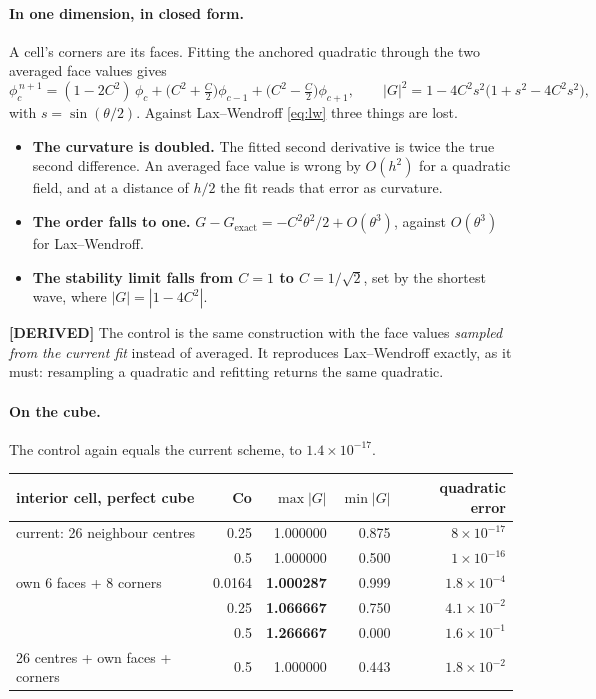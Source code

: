 \documentclass[11pt,a4paper]{article}
\newcommand{\derived}{\textcolor{blue!50!black}{\textbf{[DERIVED]}}}
\begin{document}
\paragraph{In one dimension, in closed form.} A cell's corners are its faces. Fitting the anchored
quadratic through the two averaged face values gives
\begin{equation}
  \phi_c^{\,n+1} = (1 - 2C^{2})\,\phi_c + \bigl(C^{2} + \tfrac{C}{2}\bigr)\phi_{c-1}
                 + \bigl(C^{2} - \tfrac{C}{2}\bigr)\phi_{c+1},
  \qquad
  |G|^{2} = 1 - 4C^{2}s^{2}\bigl(1 + s^{2} - 4C^{2}s^{2}\bigr),
\end{equation}
with \(s = \sin(\theta/2)\). Against Lax--Wendroff \eqref{eq:lw} three things are lost.
\begin{itemize}
\item \textbf{The curvature is doubled.} The fitted second derivative is twice the true second
      difference. An averaged face value is wrong by \(O(h^2)\) for a quadratic field, and at a
      distance of \(h/2\) the fit reads that error as curvature.
\item \textbf{The order falls to one.} \(G - G_{\text{exact}} = -C^2\theta^2/2 + O(\theta^3)\),
      against \(O(\theta^3)\) for Lax--Wendroff.
\item \textbf{The stability limit falls from \(C = 1\) to \(C = 1/\sqrt2\)}, set by the shortest
      wave, where \(|G| = |1 - 4C^2|\).
\end{itemize}

\derived{} The control is the same construction with the face values \emph{sampled from the
current fit} instead of averaged. It reproduces Lax--Wendroff exactly, as it must: resampling a
quadratic and refitting returns the same quadratic.

\paragraph{On the cube.} The control again equals the current scheme, to \(1.4\times10^{-17}\).

\begin{center}
\begin{tabular}{lrrrr}
\toprule
interior cell, perfect cube & Co & \(\max|G|\) & \(\min|G|\) & quadratic error \\
\midrule
current: 26 neighbour centres          & 0.25 & 1.000000 & 0.875 & \(8\times10^{-17}\) \\
                                       & 0.5  & 1.000000 & 0.500 & \(1\times10^{-16}\) \\
own 6 faces + 8 corners                & 0.0164 & \textbf{1.000287} & 0.999 & \(1.8\times10^{-4}\) \\
                                       & 0.25 & \textbf{1.066667} & 0.750 & \(4.1\times10^{-2}\) \\
                                       & 0.5  & \textbf{1.266667} & 0.000 & \(1.6\times10^{-1}\) \\
26 centres + own faces + corners       & 0.5  & 1.000000 & 0.443 & \(1.8\times10^{-2}\) \\
\bottomrule
\end{tabular}
\end{center}
\end{document}
